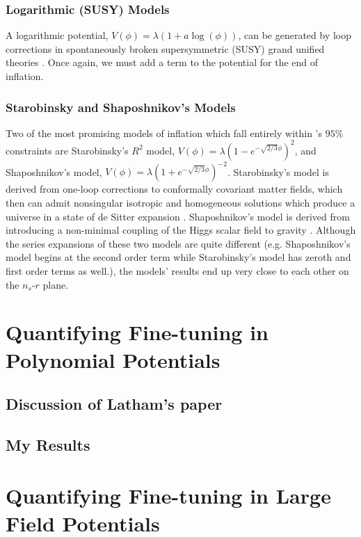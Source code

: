 \documentclass[a4paper,11pt]{article}
\def\nsr{$n_s$-$r$ }
\begin{document}
\subsubsection{Logarithmic (SUSY) Models}
A logarithmic potential, $V(\phi)=\lambda(1+a\log(\phi))$, can be generated by loop corrections in spontaneously broken supersymmetric (SUSY) grand unified theories \citep{Dvali+1994}. Once again, we must add a term to the potential for the end of inflation. 


\subsubsection{Starobinsky and Shaposhnikov's Models}
Two of the most promising models of inflation which fall entirely within \citet{Planck2015}'s $95\%$ constraints are Starobinsky's $R^2$ model, $V(\phi)=\lambda\left(1-e^{-\sqrt{2/3}\phi}\right)^2$, and Shaposhnikov's model, $V(\phi)=\lambda \left(1+e^{-\sqrt{2/3}\phi}\right)^{-2}$. Starobinsky's model is derived from one-loop corrections to conformally covariant matter fields, which then can admit nonsingular isotropic and homogeneous solutions which produce a universe in a state of de Sitter expansion \citep{Starobinsky1980}. Shaposhnikov's model is derived from introducing a non-minimal coupling of the Higgs scalar field to gravity \citep{Bezrukov+Shaposhnikov2008}. Although the series expansions of these two models are quite different (e.g. Shaposhnikov's model begins at the second order term while Starobinsky's model has zeroth and first order terms as well.), the models' results end up very close to each other on the \nsr plane.

\FloatBarrier
\newpage
\section{Quantifying Fine-tuning in Polynomial Potentials}
\subsection{Discussion of Latham's paper}
\subsection{My Results}

\newpage
\section{Quantifying Fine-tuning in Large Field Potentials}
\end{document}
